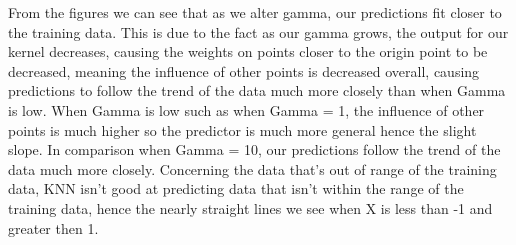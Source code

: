 \documentclass[11pt]{article} %
\begin{document}
\begin{figure}[h]
\qquad
{}
\end{figure}
From the figures we can see that as we alter gamma, our predictions fit closer to the training data. This is due to the fact as our gamma grows, the output for our kernel decreases, causing the weights on points closer to the origin point to be decreased, meaning the influence of other points is decreased overall, causing predictions to follow the trend of the data much more closely than when Gamma is low. When Gamma is low such as when Gamma = 1, the influence of other points is much higher so the predictor is much more general hence the slight slope. In comparison when Gamma = 10, our predictions follow the trend of the data much more closely. Concerning the data that's out of range of the training data, KNN isn't good at predicting data that isn't within the range of the training data, hence the nearly straight lines we see when X is less than -1 and greater then 1. 
\end{document}
